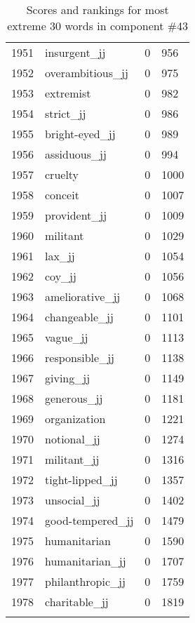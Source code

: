 \begin{longtable}[!htbp]{| rlr@{.}l |}
    1951 & insurgent\_jj & 0 & 956 \\
    1952 & overambitious\_jj & 0 & 975 \\
    1953 & extremist & 0 & 982 \\
    1954 & strict\_jj & 0 & 986 \\
    1955 & bright-eyed\_jj & 0 & 989 \\
    1956 & assiduous\_jj & 0 & 994 \\
    1957 & cruelty & 0 & 1000 \\
    1958 & conceit & 0 & 1007 \\
    1959 & provident\_jj & 0 & 1009 \\
    1960 & militant & 0 & 1029 \\
    1961 & lax\_jj & 0 & 1054 \\
    1962 & coy\_jj & 0 & 1056 \\
    1963 & ameliorative\_jj & 0 & 1068 \\
    1964 & changeable\_jj & 0 & 1101 \\
    1965 & vague\_jj & 0 & 1113 \\
    1966 & responsible\_jj & 0 & 1138 \\
    1967 & giving\_jj & 0 & 1149 \\
    1968 & generous\_jj & 0 & 1181 \\
    1969 & organization & 0 & 1221 \\
    1970 & notional\_jj & 0 & 1274 \\
    1971 & militant\_jj & 0 & 1316 \\
    1972 & tight-lipped\_jj & 0 & 1357 \\
    1973 & unsocial\_jj & 0 & 1402 \\
    1974 & good-tempered\_jj & 0 & 1479 \\
    1975 & humanitarian & 0 & 1590 \\
    1976 & humanitarian\_jj & 0 & 1707 \\
    1977 & philanthropic\_jj & 0 & 1759 \\
    1978 & charitable\_jj & 0 & 1819 \\
    \hline
    \caption{Scores and rankings for most extreme 30 words in component \#43} \\
\end{longtable}
